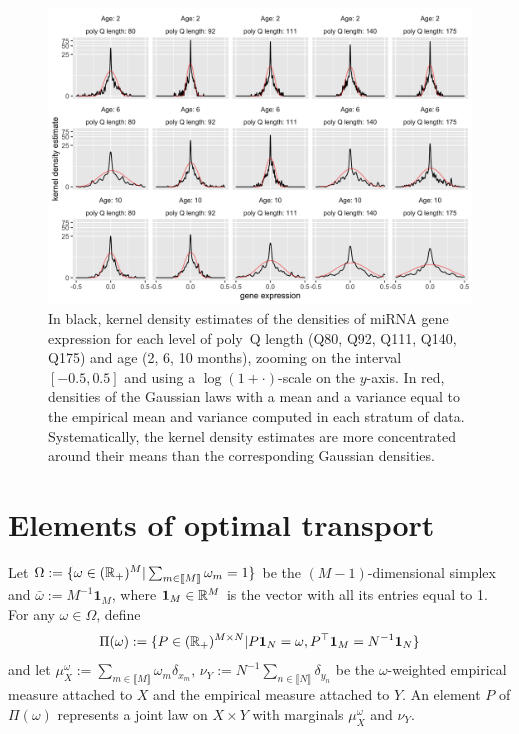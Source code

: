 \begin{figure}[h]
  \centering
  \includegraphics[width=\textwidth]{images/KDE_miRNA.png}
  \caption{In black, kernel  density estimates of the  densities of miRNA
      gene expression for  each level of poly~Q length (Q80,  Q92, Q111, Q140,
      Q175) and age  (2, 6, 10 months), zooming on  the interval $[-0.5, 0.5]$
      and using a $\log(1+\cdot)$-scale on the $y$-axis.  In red, densities of
      the Gaussian laws with a mean and a variance equal to the empirical mean
      and  variance computed  in each  stratum of  data.  Systematically,  the
      kernel density estimates  are more concentrated around  their means than
      the corresponding Gaussian densities.}
  \label{fig:KDE_miRNA}
\end{figure}




\section{Elements of optimal transport}
\label{sec:elements}

Let
$\Omega :=  \{\omega \in  (\mathbb{R}_{+})^{M} | \sum_{m\in  \llbracket M\rrbracket}
\omega_{m}    =    1\}$    be     the    $(M-1)$-dimensional    simplex    and
$\bar{\omega} :=  M^{-1} \mathbf{1}_{M}$, where $\mathbf{1}_{M}  \in \mathbb{R}^{M}$
is the vector with  all its entries equal to 1.  For  any $\omega \in \Omega$,
define
\begin{equation*}
  \Pi(\omega) := \{P \in (\mathbb{R}_+)^{M\times N} | P \mathbf1_N =
  \omega, P^\top \mathbf1_M = N^{-1}\mathbf{1}_{N}\}
\end{equation*}
and                                                                        let
$\mu_X^{\omega} := \sum_{m\in\llbracket M\rrbracket} \omega_{m} \delta_{x_m}$,
$\nu_Y  := N^{-1}  \sum_{n\in \llbracket  N \rrbracket}  \delta_{y_n}$ be  the
$\omega$-weighted empirical measure attached to  $X$ and the empirical measure
attached to  $Y$. An element  $P$ of $\Pi(\omega)$  represents a joint  law on
$X \times Y$ with marginals $\mu_X^{\omega}$ and $\nu_Y$.


